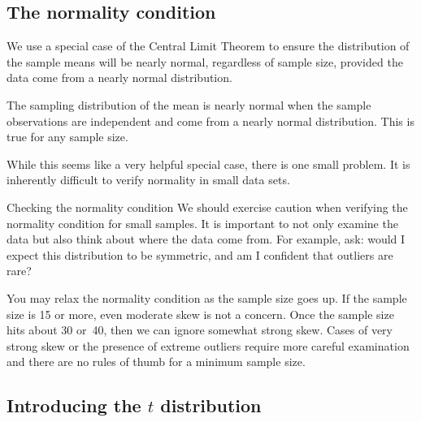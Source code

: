


\subsection{The normality condition}
\label{normalityCond}

We use a special case of the Central Limit Theorem to ensure the distribution of the sample means will be nearly normal, regardless of sample size, provided the data come from a nearly normal distribution.

\begin{termBox}{
The sampling distribution of the mean is nearly normal when the sample observations are independent and come from a nearly normal distribution. This is true for any sample size.}
\end{termBox}

While this seems like a very helpful special case, there is one small problem. It is inherently difficult to verify normality in small data sets.

\begin{caution}
{Checking the normality condition}
{We should exercise caution when verifying the normality condition for small samples. It is important to not only examine the data but also think about where the data come from. For example, ask: would I expect this distribution to be symmetric, and am I confident that outliers are rare?}
\end{caution}

You may relax the normality condition as the sample size goes up. If the sample size is 15 or more, even moderate skew is not a concern. Once the sample size hits about 30 or~40, then we can ignore somewhat strong skew. Cases of very strong skew or the presence of extreme outliers require more careful examination and there are no rules of thumb for a minimum sample size. %


\subsection{Introducing the $t$ distribution}
\label{introducingTheTDistribution}

